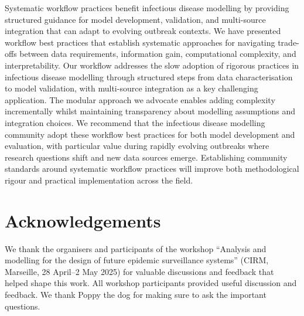 \documentclass{article}
\begin{document}
Systematic workflow practices benefit infectious disease modelling by providing structured guidance for model development, validation, and multi-source integration that can adapt to evolving outbreak contexts.
We have presented workflow best practices that establish systematic approaches for navigating trade-offs between data requirements, information gain, computational complexity, and interpretability.
Our workflow addresses the slow adoption of rigorous practices in infectious disease modelling through structured steps from data characterisation to model validation, with multi-source integration as a key challenging application.
The modular approach we advocate enables adding complexity incrementally whilst maintaining transparency about modelling assumptions and integration choices.
We recommend that the infectious disease modelling community adopt these workflow best practices for both model development and evaluation, with particular value during rapidly evolving outbreaks where research questions shift and new data sources emerge.
Establishing community standards around systematic workflow practices will improve both methodological rigour and practical implementation across the field.

\section{Acknowledgements}

We thank the organisers and participants of the workshop ``Analysis and modelling for the design of future epidemic surveillance systems'' (CIRM, Marseille, 28 April–2 May 2025) for valuable discussions and feedback that helped shape this work.
All workshop participants provided useful discussion and feedback.
We thank Poppy the dog for making sure to ask the important questions.
\pagebreak


\end{document}

